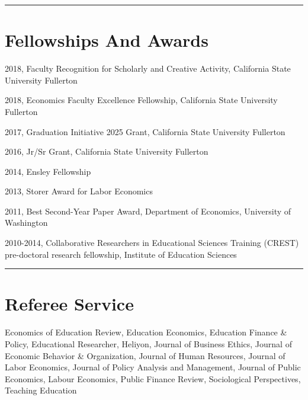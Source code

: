 \documentclass[11pt,a4paper]{article}
\begin{document}
\vspace{1cm} \hrule \vspace{1cm}





\section*{Fellowships And Awards} 



2018, Faculty Recognition for Scholarly and Creative Activity, California State University Fullerton



2018, Economics Faculty Excellence Fellowship, California State University Fullerton



2017, Graduation Initiative 2025 Grant, California State University Fullerton



2016, Jr/Sr Grant, California State University Fullerton



2014, Ensley Fellowship



2013, Storer Award for Labor Economics



2011, Best Second-Year Paper Award, Department of Economics, University of Washington



2010-2014, Collaborative Researchers in Educational Sciences Training (CREST) pre-doctoral research fellowship, Institute of Education Sciences



\vspace{1cm} \hrule \vspace{1cm}





\section*{Referee Service} 



Economics of Education Review, Education Economics, Education Finance \& Policy, Educational Researcher, Heliyon, Journal of Business Ethics, Journal of Economic Behavior \& Organization, Journal of Human Resources, Journal of Labor Economics, Journal of Policy Analysis and Management, Journal of Public Economics, Labour Economics, Public Finance Review, Sociological Perspectives, Teaching Education
\end{document}
